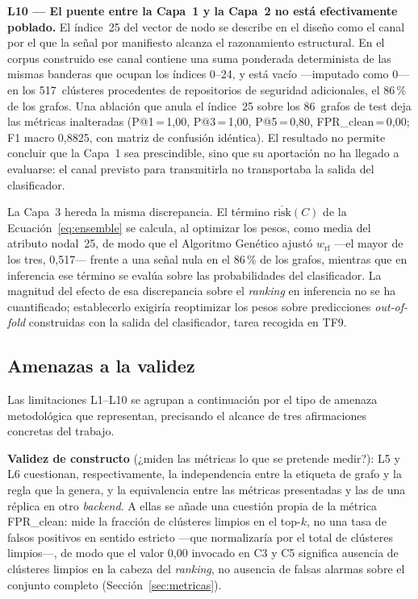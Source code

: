 \textbf{L10 — El puente entre la Capa~1 y la Capa~2 no está efectivamente
poblado.} El índice~25 del vector de nodo se describe en el diseño como el canal
por el que la señal por manifiesto alcanza el razonamiento estructural. En el
corpus construido ese canal contiene una suma ponderada determinista de las mismas
banderas que ocupan los índices 0--24, y está vacío —imputado como 0— en los
517~clústeres procedentes de repositorios de seguridad adicionales, el 86\,\% de
los grafos. Una ablación que anula el índice~25 sobre los 86~grafos de test deja
las métricas inalteradas (P@1\,=\,1,00, P@3\,=\,1,00, P@5\,=\,0,80,
\ac{FPR}\_clean\,=\,0,00; F1 macro 0,8825, con matriz de confusión idéntica). El
resultado no permite concluir que la Capa~1 sea prescindible, sino que su
aportación no ha llegado a evaluarse: el canal previsto para transmitirla no
transportaba la salida del clasificador.

La Capa~3 hereda la misma discrepancia. El término \(\overline{\text{risk}}(C)\)
de la Ecuación~\ref{eq:ensemble} se calcula, al optimizar los pesos, como media
del atributo nodal~25, de modo que el Algoritmo Genético ajustó
\(w_{\text{rf}}\) —el mayor de los tres, 0,517— frente a una señal nula en el
86\,\% de los grafos, mientras que en inferencia ese término se evalúa sobre las
probabilidades del clasificador. La magnitud del efecto de esa discrepancia sobre
el \textit{ranking} en inferencia no se ha cuantificado; establecerlo exigiría
reoptimizar los pesos sobre predicciones \textit{out-of-fold} construidas con la
salida del clasificador, tarea recogida en TF9.

\subsection{Amenazas a la validez}
\label{sec:amenazas_validez}

Las limitaciones L1--L10 se agrupan a continuación por el tipo de amenaza
metodológica que representan, precisando el alcance de tres afirmaciones
concretas del trabajo.

\textbf{Validez de constructo} (¿miden las métricas lo que se pretende medir?):
L5 y L6 cuestionan, respectivamente, la independencia entre la etiqueta de grafo y
la regla que la genera, y la equivalencia entre las métricas presentadas y las de
una réplica en otro \textit{backend}. A ellas se añade una cuestión propia de la
métrica \ac{FPR}\_clean: mide la fracción de clústeres limpios en el top-\(k\), no
una tasa de falsos positivos en sentido estricto —que normalizaría por el total de
clústeres limpios\mbox{—,} de modo que el valor 0,00 invocado en C3 y C5 significa
ausencia de clústeres limpios en la cabeza del \textit{ranking}, no ausencia de
falsas alarmas sobre el conjunto completo (Sección~\ref{sec:metricas}).

